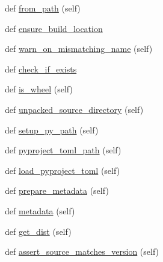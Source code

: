 \begin{DoxyCompactItemize}
\item 
def \hyperlink{classpip_1_1__internal_1_1req_1_1req__install_1_1InstallRequirement_ac166a7d15dfbf0fcd2fe092f018c0a3e}{from\+\_\+path} (self)
\item 
def \hyperlink{classpip_1_1__internal_1_1req_1_1req__install_1_1InstallRequirement_a324bf12ceabff6a1bd63dfa7c260eb07}{ensure\+\_\+build\+\_\+location}
\item 
def \hyperlink{classpip_1_1__internal_1_1req_1_1req__install_1_1InstallRequirement_a7fe1722f275fdf45313968ca29e8051d}{warn\+\_\+on\+\_\+mismatching\+\_\+name} (self)
\item 
def \hyperlink{classpip_1_1__internal_1_1req_1_1req__install_1_1InstallRequirement_a6877bce7b271f3d5e642ccefa733cb11}{check\+\_\+if\+\_\+exists}
\item 
def \hyperlink{classpip_1_1__internal_1_1req_1_1req__install_1_1InstallRequirement_a23767522900e1d7723ce439915de7704}{is\+\_\+wheel} (self)
\item 
def \hyperlink{classpip_1_1__internal_1_1req_1_1req__install_1_1InstallRequirement_a522fe2281c21e2a2854d126345f9b892}{unpacked\+\_\+source\+\_\+directory} (self)
\item 
def \hyperlink{classpip_1_1__internal_1_1req_1_1req__install_1_1InstallRequirement_aed9c5818e7bb19a83009fc851fd2f307}{setup\+\_\+py\+\_\+path} (self)
\item 
def \hyperlink{classpip_1_1__internal_1_1req_1_1req__install_1_1InstallRequirement_ab72ec7c8ff74c7508e9207918bb406f0}{pyproject\+\_\+toml\+\_\+path} (self)
\item 
def \hyperlink{classpip_1_1__internal_1_1req_1_1req__install_1_1InstallRequirement_a94ba23742f54a6031791363c53c0cd49}{load\+\_\+pyproject\+\_\+toml} (self)
\item 
def \hyperlink{classpip_1_1__internal_1_1req_1_1req__install_1_1InstallRequirement_a048131d02e7f12b151a9cf8fb3b38df6}{prepare\+\_\+metadata} (self)
\item 
def \hyperlink{classpip_1_1__internal_1_1req_1_1req__install_1_1InstallRequirement_a6b223d8bc47fb38d34bd601fb8848071}{metadata} (self)
\item 
def \hyperlink{classpip_1_1__internal_1_1req_1_1req__install_1_1InstallRequirement_ac2378ff02b4b6f34558111734da37e7b}{get\+\_\+dist} (self)
\item 
def \hyperlink{classpip_1_1__internal_1_1req_1_1req__install_1_1InstallRequirement_a79286ee096e3f8defb8b576de52b577c}{assert\+\_\+source\+\_\+matches\+\_\+version} (self)
\item 

\end{DoxyCompactItemize}
